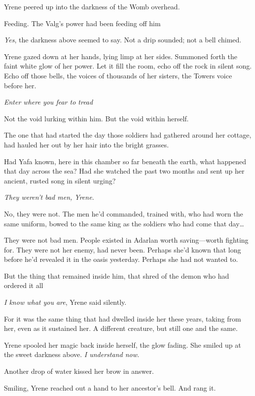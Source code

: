 Yrene peered up into the darkness of the Womb overhead.

Feeding. The Valg's power had been feeding off him 

\emph{Yes}, the darkness above seemed to say. Not a drip sounded; not a bell chimed.

Yrene gazed down at her hands, lying limp at her sides. Summoned forth the faint white glow of her power. Let it fill the room, echo off the rock in silent song. Echo off those bells, the voices of thousands of her sisters, the Towers voice before her.

\emph{Enter where you fear to tread }

Not the void lurking within him. But the void within herself.

The one that had started the day those soldiers had gathered around her cottage, had hauled her out by her hair into the bright grasses.

Had Yafa known, here in this chamber so far beneath the earth, what happened that day across the sea? Had she watched the past two months and sent up her ancient, rusted song in silent urging?

\emph{They weren't bad men, Yrene.}

No, they were not. The men he'd commanded, trained with, who had worn the same uniform, bowed to the same king as the soldiers who had come that day\ldots

They were not bad men. People existed in Adarlan worth saving---worth fighting for. They were not her enemy, had never been. Perhaps she'd known that long before he'd revealed it in the oasis yesterday. Perhaps she had not wanted to.

But the thing that remained inside him, that shred of the demon who had ordered it all 

\emph{I know what you are}, Yrene said silently.

For it was the same thing that had dwelled inside her these years, taking from her, even as it sustained her. A different creature, but still one and the same.

Yrene spooled her magic back inside herself, the glow fading. She smiled up at the sweet darkness above. \emph{I understand now.}

Another drop of water kissed her brow in answer.

Smiling, Yrene reached out a hand to her ancestor's bell. And rang it.

